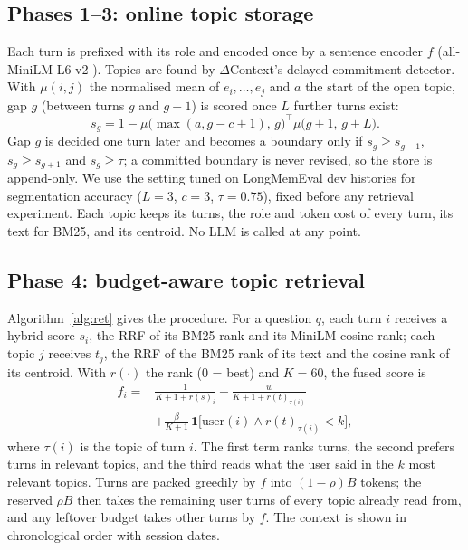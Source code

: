 \documentclass[conference]{IEEEtran}
\newcommand{\dc}{$\Delta$Context}
\begin{document}
\subsection{Phases 1--3: online topic storage}
Each turn is prefixed with its role and encoded once by a sentence encoder $f$
(all-MiniLM-L6-v2 \cite{reimers2019sbert}). Topics are found by \dc{}'s
delayed-commitment detector. With $\mu(i,j)$ the normalised mean of
$e_i,\dots,e_j$ and $a$ the start of the open topic, gap $g$ (between turns $g$
and $g{+}1$) is scored once $L$ further turns exist:
\begin{equation}
s_g = 1-\mu\bigl(\max(a,g-c+1),\,g\bigr)^{\top}\mu\bigl(g+1,\,g+L\bigr).
\end{equation}
Gap $g$ is decided one turn later and becomes a boundary only if
$s_g\ge s_{g-1}$, $s_g\ge s_{g+1}$ and $s_g\ge\tau$; a committed boundary is
never revised, so the store is append-only. We use the setting tuned on
LongMemEval dev histories for segmentation accuracy ($L{=}3$, $c{=}3$,
$\tau{=}0.75$), fixed before any retrieval experiment. Each topic keeps
its turns, the role and token cost of every turn, its text for BM25, and its
centroid. No LLM is called at any point.

\subsection{Phase 4: budget-aware topic retrieval}
Algorithm~\ref{alg:ret} gives the procedure. For a question $q$, each turn $i$
receives a hybrid score $s_i$, the RRF \cite{cormack2009rrf} of its BM25 rank
\cite{robertson2009bm25} and its MiniLM cosine rank; each topic $j$ receives
$t_j$, the RRF of the BM25 rank of its text and the cosine rank of its centroid.
With $r(\cdot)$ the rank (0 = best) and $K{=}60$, the fused score is
\begin{align}
f_i={}&\frac{1}{K+1+r(s)_i}+\frac{w}{K+1+r(t)_{\tau(i)}}\nonumber\\
&+\frac{\beta}{K+1}\,\mathbf{1}\bigl[\mathrm{user}(i)\wedge r(t)_{\tau(i)}<k\bigr],
\label{eq:fused}
\end{align}
where $\tau(i)$ is the topic of turn $i$. The first term ranks turns, the second
prefers turns in relevant topics, and the third reads what the user said in the
$k$ most relevant topics. Turns are packed greedily by $f$ into $(1-\rho)B$
tokens; the reserved $\rho B$ then takes the remaining user turns of every topic
already read from, and any leftover budget takes other turns by $f$. The context
is shown in chronological order with session dates.
\end{document}
